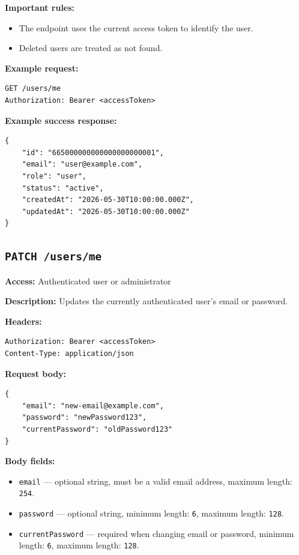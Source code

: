 \textbf{Important rules:}

\begin{itemize}
    \item The endpoint uses the current access token to identify the user.
    \item Deleted users are treated as not found.
\end{itemize}

\textbf{Example request:}

\begin{verbatim}
GET /users/me
Authorization: Bearer <accessToken>
\end{verbatim}

\pagebreak
\textbf{Example success response:}

\begin{verbatim}
{
    "id": "665000000000000000000001",
    "email": "user@example.com",
    "role": "user",
    "status": "active",
    "createdAt": "2026-05-30T10:00:00.000Z",
    "updatedAt": "2026-05-30T10:00:00.000Z"
}
\end{verbatim}

\subsection{\texttt{PATCH /users/me}}

\textbf{Access:} Authenticated user or administrator

\textbf{Description:} Updates the currently authenticated user's email or password.

\textbf{Headers:}

\begin{verbatim}
Authorization: Bearer <accessToken>
Content-Type: application/json
\end{verbatim}

\textbf{Request body:}

\begin{verbatim}
{
    "email": "new-email@example.com",
    "password": "newPassword123",
    "currentPassword": "oldPassword123"
}
\end{verbatim}

\textbf{Body fields:}

\begin{itemize}
    \item \texttt{email} --- optional string, must be a valid email address, maximum length: \texttt{254}.
    \item \texttt{password} --- optional string, minimum length: \texttt{6}, maximum length: \texttt{128}.
    \item \texttt{currentPassword} --- required when changing email or password, minimum length: \texttt{6}, maximum length: \texttt{128}.
\end{itemize}

